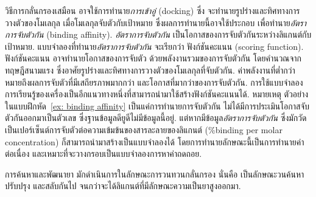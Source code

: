 {\begin{shaded}
วิธีการกลั่นกรองเสมือน อาจใช้การทำนาย\textit{การเข้าอู่} (docking)
ซึ่ง
จะทำนายรูปร่างและทิศทางการวางตัวของโมเลกุล เมื่อโมเลกุลจับตัวกับเป้าหมาย
ซึ่งผลการทำนายนี้อาจใช้ประกอบ เพื่อทำนาย\textit{อัตราการจับตัวกัน} (binding affinity).
\textit{อัตราการจับตัวกัน} เป็นโอกาสของการจับตัวกันระหว่างลิแกนต์กับเป้าหมาย.
แบบจำลองที่ทำนาย\textit{อัตราการจับตัวกัน} จะเรียกว่า
ฟังก์ชันคะแนน (scoring function).
ฟังก์ชันคะแนน อาจทำนายโอกาสของการจับตัว ด้วยพลังงานรวมของการจับตัวกัน
โดยคำนวณจากทฤษฎีสนามแรง ซึ่งอาศัยรูปร่างและทิศทางการวางตัวของโมเลกุลที่จับตัวกัน.
ค่าพลังงานที่ต่ำกว่า หมายถึงผลการจับตัวที่มีเสถียรภาพมากกว่า และโอกาสที่มากว่าของการจับตัวกัน.
การใช้แบบจำลองการเรียนรู้ของเครื่องเป็นอีกแนวทางหนึ่งที่สามารถนำมาใช้สร้างฟังก์ชันคะแนนได้.
หมายเหตุ ตัวอย่างในแบบฝึกหัด~\ref{ex: binding affinity} เป็นแค่การทำนายการจับตัวกัน
ไม่ได้มีการประเมินโอกาสจับตัวกันออกมาเป็นตัวเลข ซึ่งฐานข้อมูลดียูดีไม่มีข้อมูลนี้อยู่.
แต่หากมีข้อมูล\textit{อัตราการจับตัวกัน} ซึ่งมักวัดเป็นเปอร์เซ็นต์การจับตัวต่อความเข้มข้นของสารละลายของลิแกนต์ 
(\%binding per molar concentration)
ก็สามารถนำมาสร้างเป็นแบบจำลองได้ โดยการทำนายลักษณะนี้เป็นการทำนายค่าต่อเนื่อง และเหมาะที่จะวางกรอบเป็นแบบจำลองการหาค่าถดถอย.

การค้นหาและพัฒนายา
มักดำเนินการในลักษณะการวนทวนกลั่นกรอง
นั่นคือ เป็นลักษณะวนค้นหา ปรับปรุง และสลับกันไป
จนกว่าจะได้ลิแกนต์ที่มีลักษณะความเป็นยาสูงออกมา. %


\end{shaded}}
